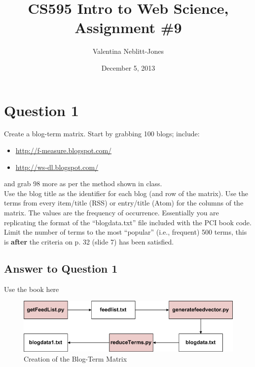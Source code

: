 \documentclass{article}
\begin{document}
\title{CS595 Intro to Web Science, Assignment \#9}
\author{Valentina Neblitt-Jones}
\date{December 5, 2013}
\maketitle

\newpage
\listoftables
\lstlistoflistings
\listoffigures

\newpage
\section*{Question 1}

Create a blog-term matrix. Start by grabbing 100 blogs; include: \\

\begin{itemize}
\item \url{http://f-measure.blogspot.com/}
\item \url{http://ws-dl.blogspot.com/}
\end{itemize}

and grab 98 more as per the method shown in class. \\

Use the blog title as the identifier for each blog (and row of the matrix). Use the terms from every item/title (RSS) or entry/title (Atom) for the columns of the matrix. The values are the frequency of occurrence. Essentially you are replicating the format of the ``blogdata.txt'' file included with the PCI book code. Limit the number of terms to the most ``popular'' (i.e., frequent) 500 terms, this is \textbf{after} the criteria on p. 32 (slide 7) has been satisfied.

\subsection*{Answer to Question 1}
Use the book here \cite{pci}

\begin{figure}[H]
\centering
\includegraphics[scale=0.50]{q01/FlowForQ1}
\caption{Creation of the Blog-Term Matrix}
\label{FlowForQ1}
\end{figure}
\end{document}
